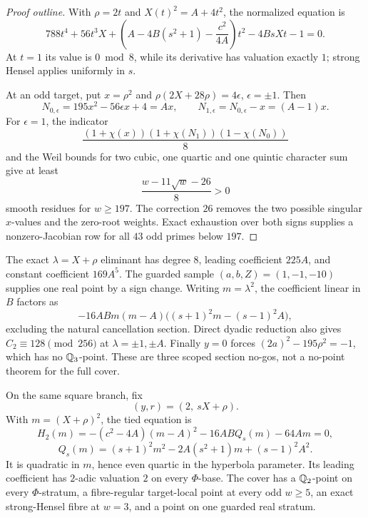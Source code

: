 \begin{proof}[Proof outline]
With \(\rho=2t\) and \(X(t)^2=A+4t^2\), the normalized equation is
\[
 788t^4+56t^3X+
 \left(A-4B(s^2+1)-\frac{c^2}{4A}\right)t^2
 -4BsXt-1=0.
\]
At \(t=1\) its value is \(0\bmod8\), while its derivative has
valuation exactly \(1\); strong Hensel applies uniformly in \(s\).

At an odd target, put \(x=\rho^2\) and
\(\rho(2X+28\rho)=4\epsilon\), \(\epsilon=\pm1\).  Then
\[
 N_{0,\epsilon}=195x^2-56\epsilon x+4=Ax,\qquad
 N_{1,\epsilon}=N_{0,\epsilon}-x=(A-1)x.
\]
For \(\epsilon=1\), the indicator
\[
 \frac{(1+\chi(x))(1+\chi(N_1))(1-\chi(N_0))}{8}
\]
and the Weil bounds for two cubic, one quartic and one quintic character
sum give at least
\[
 \frac{w-11\sqrt w-26}{8}>0
\]
smooth residues for \(w\ge197\).  The correction \(26\) removes the
two possible singular \(x\)-values and the zero-root weights.  Exact
exhaustion over both signs supplies a nonzero-Jacobian row for all
\(43\) odd primes below \(197\).
\end{proof}

The exact \(\lambda=X+\rho\) eliminant has degree \(8\), leading
coefficient \(225A\), and constant coefficient \(169A^5\).  The guarded
sample \((a,b,Z)=(1,-1,-10)\) supplies one real point by a sign change.
Writing \(m=\lambda^2\), the coefficient linear in \(B\) factors as
\[
-16ABm(m-A)\bigl((s+1)^2m-(s-1)^2A\bigr),
\]
excluding the natural cancellation section.  Direct dyadic reduction
also gives \(C_2\equiv128\pmod{256}\) at
\(\lambda=\pm1,\pm A\).  Finally \(y=0\) forces
\((2a)^2-195\rho^2=-1\), which has no \(\mathbb{Q}_3\)-point.  These are three
scoped section no-gos, not a no-point theorem for the full cover.

\begin{theorem}
\label{thm:constanttwo}
On the same square branch, fix
\[
 (y,r)=(2,\ sX+\rho).
\]
With \(m=(X+\rho)^2\), the tied equation is
\[
 H_2(m)=-(c^2-4A)(m-A)^2-16ABQ_s(m)-64Am=0,
\]
\[
 Q_s(m)=(s+1)^2m^2-2A(s^2+1)m+(s-1)^2A^2.
\]
It is quadratic in \(m\), hence even quartic in the hyperbola parameter.
Its leading coefficient has \(2\)-adic valuation \(2\) on every
\(\Phi\)-base.  The cover has a \(\mathbb{Q}_2\)-point on every \(\Phi\)-stratum,
a fibre-regular target-local point at every odd \(w\ge5\), an exact
strong-Hensel fibre at \(w=3\), and a point on one guarded real stratum.
\end{theorem}

